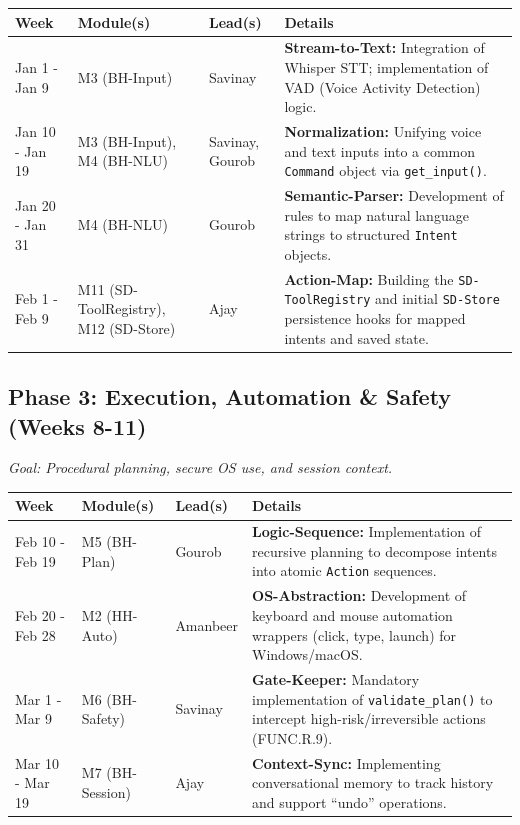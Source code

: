 \documentclass[12pt, titlepage]{article}
\begin{document}
\begin{tabularx}{\textwidth}{|>{\raggedright\arraybackslash}p{}|>{\raggedright\arraybackslash}p{}|>{\raggedright\arraybackslash}p{}|>{\raggedright\arraybackslash}X|}
\hline
\textbf{Week} & \textbf{Module(s)} & \textbf{Lead(s)} & \textbf{Details} 
\\ \hline
Jan 1 - Jan 9 & M3 (BH-Input) & Savinay & \textbf{Stream-to-Text:} Integration of Whisper STT; 
implementation of VAD (Voice Activity Detection) logic. \\ \hline
Jan 10 - Jan 19 & M3 (BH-Input), M4 (BH-NLU) & Savinay, Gourob & \textbf{Normalization:} Unifying voice and text 
inputs into a common \texttt{Command} object via \texttt{get\_input()}. \\ 
\hline
Jan 20 - Jan 31 & M4 (BH-NLU) & Gourob & \textbf{Semantic-Parser:} Development of rules to map natural 
language strings to structured \texttt{Intent} objects. \\ \hline
Feb 1 - Feb 9 & M11 (SD-ToolRegistry), M12 (SD-Store) & Ajay & \textbf{Action-Map:} Building the \texttt{SD-ToolRegistry} 
and initial \texttt{SD-Store} persistence hooks for mapped intents and saved state. \\ \hline
\end{tabularx}


\subsection{Phase 3: Execution, Automation \& Safety (Weeks 8-11)}
\textit{Goal: Procedural planning, secure OS use, and session context.}

\begin{tabularx}{\textwidth}{|>{\raggedright\arraybackslash}p{}|>{\raggedright\arraybackslash}p{}|>{\raggedright\arraybackslash}p{}|>{\raggedright\arraybackslash}X|}
\hline
\textbf{Week} & \textbf{Module(s)} & \textbf{Lead(s)} & \textbf{Details} \\ \hline
Feb 10 - Feb 19 & M5 (BH-Plan) & Gourob & \textbf{Logic-Sequence:} Implementation of recursive planning 
to decompose intents into atomic \texttt{Action} sequences. \\ \hline
Feb 20 - Feb 28 & M2 (HH-Auto) & Amanbeer & \textbf{OS-Abstraction:} Development of keyboard and 
mouse automation wrappers (click, type, launch) for Windows/macOS. \\ \hline
Mar 1 - Mar 9 & M6 (BH-Safety) & Savinay & \textbf{Gate-Keeper:} Mandatory implementation of 
\texttt{validate\_plan()} to intercept high-risk/irreversible actions 
(FUNC.R.9). \\ \hline
Mar 10 - Mar 19 & M7 (BH-Session) & Ajay & \textbf{Context-Sync:} Implementing conversational memory to 
track history and support ``undo'' operations. \\ \hline
\end{tabularx}
\end{document}
